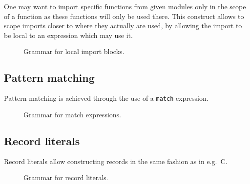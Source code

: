 One may want to import specific functions from given modules only in the scope of a function as these functions will only be used there.
This construct allows to scope imports closer to where they actually are used, by allowing the import to be local to an expression which may use it.

\begin{figure}[H]
	\centering


	\caption{Grammar for local import blocks.}
	\label{fig:zilch-grammar-expressions-import-grammar}
\end{figure}

\subsection{Pattern matching}\label{subsec:zilch-grammar-expressions-match}

Pattern matching is achieved through the use of a \texttt{match} expression.

\begin{figure}[H]
	\centering


	\caption{Grammar for match expressions.}
	\label{fig:zilch-grammar-expressions-match-grammar}
\end{figure}

\subsection{Record literals}\label{subsec:zilch-grammar-expressions-record}

Record literals allow constructing records in the same fashion as in e.g.\ C.

\begin{figure}[H]
	\centering


	\caption{Grammar for record literals.}
	\label{fig:zilch-gramma-expressions-record-grammar}
\end{figure}

